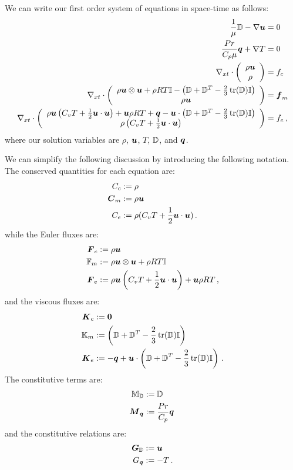 \documentclass[Dissertation.tex]{subfiles}
\begin{document}
We can write our first order system of equations in space-time as follows:
\begin{subequations}
\label{eq:compressibleNSFirstOrder}
\begin{align}
	\frac{1}{\mu}\mathbb{D}-\nabla\boldsymbol u&=0\\
	\frac{Pr}{C_p\mu}\boldsymbol q+\nabla T&=0\\
	\nabla_{xt}\cdot\left( \begin{array}{c} \rho\boldsymbol u\\ \rho\\ \end{array} \right)&=f_c\\
	\nabla_{xt}\cdot\left( \begin{array}{c} \rho\boldsymbol u\otimes\boldsymbol u+\rho RT\mathbb{I}-\left( \mathbb{D}+\mathbb{D}^T-\frac{2}{3}\operatorname*{tr}(\mathbb{D})\mathbb{I} \right)\\ \rho\boldsymbol u\\ \end{array} \right)&=\boldsymbol f_m\\
	\nabla_{xt}\cdot\left( \begin{array}{c} \rho\boldsymbol u\left( C_v T+\frac{1}{2}\boldsymbol u\cdot\boldsymbol u \right)+\boldsymbol u\rho RT+\boldsymbol q
	-\boldsymbol u\cdot\left( \mathbb{D}+\mathbb{D}^T-\frac{2}{3}\operatorname*{tr}(\mathbb{D})\mathbb{I} \right)\\ \rho\left( C_v T+\frac{1}{2}\boldsymbol u\cdot\boldsymbol u \right)\\ \end{array} \right)&=f_e\,,
\end{align}
\end{subequations}
where our solution variables are $\rho$, $\boldsymbol u$, $T$, $\mathbb{D}$, and $\boldsymbol q$.

We can simplify the following discussion by introducing the following notation. 
The conserved quantities for each equation are:
\begin{align*}
C_c&:=\rho\\
\boldsymbol C_m&:=\rho\boldsymbol u\\
C_e&:=\rho(C_v T+\frac{1}{2}\boldsymbol u\cdot\boldsymbol u)\,.
\end{align*}
while the Euler fluxes are:
\begin{align*}
\boldsymbol F_c&:=\rho\boldsymbol u\\
\mathbb{F}_m&:=\rho\boldsymbol u\otimes\boldsymbol u+\rho RT\mathbb{I}\\
\boldsymbol F_e&:=\rho\boldsymbol u\left( C_v T+\frac{1}{2}\boldsymbol u\cdot\boldsymbol u \right)+\boldsymbol u\rho RT\,,
\end{align*}
and the viscous fluxes are:
\begin{align*}
\boldsymbol K_c&:=\boldsymbol 0\\
\mathbb{K}_m&:=\left( \mathbb{D}+\mathbb{D}^T-\frac{2}{3}\operatorname*{tr}(\mathbb{D})\mathbb{I} \right)\\
\boldsymbol K_e&:=-\boldsymbol q+\boldsymbol u\cdot\left( \mathbb{D}+\mathbb{D}^T-\frac{2}{3}\operatorname*{tr}(\mathbb{D})\mathbb{I} \right)\,.
\end{align*}
The constitutive terms are:
\begin{align*}
\mathbb{M}_{\mathbb{D}}&:=\mathbb{D}\\
\boldsymbol M_{\boldsymbol q}&:=\frac{Pr}{C_p}\boldsymbol q\,
\end{align*}
and the constitutive relations are:
\begin{align*}
\boldsymbol G_{\mathbb{D}}&:=\boldsymbol u\\
G_{\boldsymbol q}&:=-T\,.
\end{align*}
\end{document}

